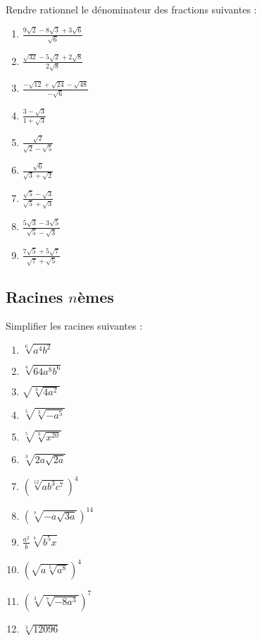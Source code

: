 \begin{exercice}
Rendre rationnel le dénominateur des fractions suivantes :
\begin{multicols}{3}
\begin{enumerate}
\item $\frac{9\sqrt{2}-8\sqrt{3}+3\sqrt{6}}{\sqrt{6}}$ 
\item $\frac{\sqrt{32}-5\sqrt{2}+2\sqrt{8}}{2\sqrt{8}}$ 
\item $\frac{-\sqrt{12}+\sqrt{24}-\sqrt{48}}{-\sqrt{6}}$ 
\item $\frac{3-\sqrt{3}}{1+\sqrt{3}}$
\item $\frac{\sqrt{2}}{\sqrt{2}-\sqrt{5}}$
\item $\frac{\sqrt{6}}{\sqrt{3}+\sqrt{2}}$
\item $\frac{\sqrt{5}-\sqrt{3}}{\sqrt{5}+\sqrt{3}}$
\item $\frac{5\sqrt{3}-3\sqrt{5}}{\sqrt{5}-\sqrt{3}}$
\item $\frac{7\sqrt{5}+5\sqrt{7}}{\sqrt{7}+\sqrt{5}}$
\end{enumerate}
\end{multicols}
\end{exercice}

\subsection{Racines $n$èmes}

\begin{exercice}
Simplifier les racines suivantes :
\begin{multicols}{3}
\begin{enumerate}
\item $\sqrt[6]{{{a}^{4}}{{b}^{2}}}$ 
\item $\sqrt[4]{64{{a}^{8}}{{b}^{6}}}$ 
\item $\sqrt{\sqrt[3]{4{{a}^{2}}}}$ 
\item $\sqrt[5]{\sqrt[3]{-{{a}^{5}}}}$ 
\item $\sqrt[5]{\sqrt[3]{{{x}^{20}}}}$
\item $\sqrt[3]{2a\sqrt{2a}}$
\item ${{\left( \sqrt[12]{a{{b}^{3}}{{c}^{7}}} \right)}^{4}}$
\item ${{\left( \sqrt[7]{-a\sqrt{3a}} \right)}^{14}}$
\item $\frac{{{a}^{2}}}{b}\sqrt[4]{{{b}^{5}}x}$
\item ${{\left( \sqrt{a\sqrt[5]{{{a}^{8}}}} \right)}^{4}}$
\item ${{\left( \sqrt[3]{\sqrt[7]{-8{{a}^{3}}}} \right)}^{7}}$
\item $\sqrt[3]{12096}$
\end{enumerate}
\end{multicols}
\end{exercice}

